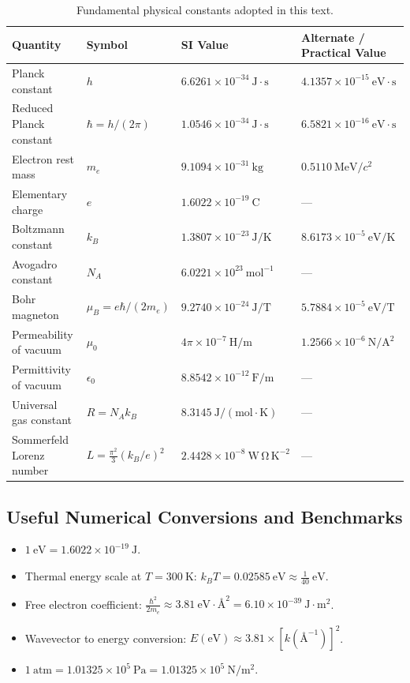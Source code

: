 \documentclass[11pt,a4paper]{article}
\begin{document}
\begin{table}[ht]
\centering
\small
\renewcommand{\arraystretch}{1.2}
\begin{tabular}{llll}
\toprule
\textbf{Quantity} & \textbf{Symbol} & \textbf{SI Value} & \textbf{Alternate / Practical Value} \\
\midrule
Planck constant & $h$ & $6.6261 \times 10^{-34}\ \mathrm{J\cdot s}$ & $4.1357 \times 10^{-15}\ \mathrm{eV\cdot s}$ \\
Reduced Planck constant & $\hbar = h/(2\pi)$ & $1.0546 \times 10^{-34}\ \mathrm{J\cdot s}$ & $6.5821 \times 10^{-16}\ \mathrm{eV\cdot s}$ \\
Electron rest mass & $m_e$ & $9.1094 \times 10^{-31}\ \mathrm{kg}$ & $0.5110\ \mathrm{MeV}/c^2$ \\
Elementary charge & $e$ & $1.6022 \times 10^{-19}\ \mathrm{C}$ & --- \\
Boltzmann constant & $k_B$ & $1.3807 \times 10^{-23}\ \mathrm{J/K}$ & $8.6173 \times 10^{-5}\ \mathrm{eV/K}$ \\
Avogadro constant & $N_A$ & $6.0221 \times 10^{23}\ \mathrm{mol^{-1}}$ & --- \\
Bohr magneton & $\mu_B = e\hbar/(2m_e)$ & $9.2740 \times 10^{-24}\ \mathrm{J/T}$ & $5.7884 \times 10^{-5}\ \mathrm{eV/T}$ \\
Permeability of vacuum & $\mu_0$ & $4\pi \times 10^{-7}\ \mathrm{H/m}$ & $1.2566 \times 10^{-6}\ \mathrm{N/A^2}$ \\
Permittivity of vacuum & $\epsilon_0$ & $8.8542 \times 10^{-12}\ \mathrm{F/m}$ & --- \\
Universal gas constant & $R = N_A k_B$ & $8.3145\ \mathrm{J/(mol\cdot K)}$ & --- \\
Sommerfeld Lorenz number & $L = \frac{\pi^2}{3}(k_B/e)^2$ & $2.4428 \times 10^{-8}\ \mathrm{W\,\Omega\,K^{-2}}$ & --- \\
\bottomrule
\end{tabular}
\caption{Fundamental physical constants adopted in this text.}
\label{tab:constants}
\end{table}

\subsection*{Useful Numerical Conversions and Benchmarks}
\begin{itemize}[leftmargin=1.5cm]
    \item $1\ \mathrm{eV} = 1.6022 \times 10^{-19}\ \mathrm{J}$.
    \item Thermal energy scale at $T = 300\ \mathrm{K}$: $k_B T = 0.02585\ \mathrm{eV} \approx \frac{1}{40}\ \mathrm{eV}$.
    \item Free electron coefficient: $\frac{\hbar^2}{2m_e} \approx 3.81\ \mathrm{eV\cdot\text{\AA}^2} = 6.10 \times 10^{-39}\ \mathrm{J\cdot m^2}$.
    \item Wavevector to energy conversion: $E(\mathrm{eV}) \approx 3.81 \times [k(\text{\AA}^{-1})]^2$.
    \item $1\ \mathrm{atm} = 1.01325 \times 10^5\ \mathrm{Pa} = 1.01325 \times 10^5\ \mathrm{N/m^2}$.
\end{itemize}
\end{document}
